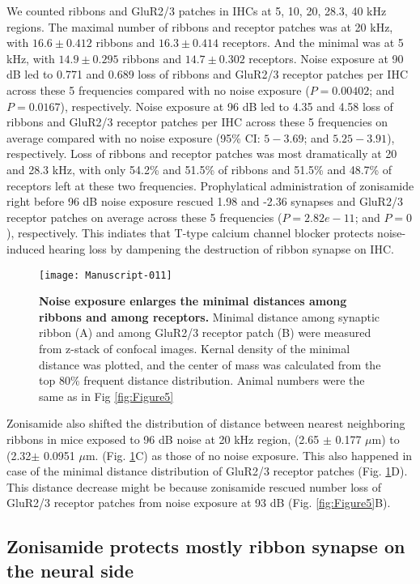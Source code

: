\documentclass[11pt]{article}
\begin{document}
We counted ribbons and GluR2/3 patches in IHCs at 5, 10, 20, 28.3, 40 kHz regions. The maximal number of ribbons and receptor patches was at 20 kHz, with 
$16.6 \pm 
0.412$ ribbons and 
$16.3 \pm 
0.414$ receptors. 
And the minimal was at 5 kHz, with 
$14.9 \pm 
0.295$ ribbons and 
$14.7 \pm 
0.302$ receptors. 
Noise exposure at 90 dB led to 0.771 and 0.689 loss of ribbons and GluR2/3 receptor patches per IHC across these 5 frequencies compared with no noise exposure 
($P=0.00402$; and 
 $P=0.0167$), respectively. Noise exposure at 96 dB led to 4.35 and 4.58 loss of ribbons and GluR2/3 receptor patches per IHC across these 5 frequencies on average compared with no noise exposure 
(95\% CI: $5 - 3.69$; and 
 $5.25 - 3.91$), respectively. Loss of ribbons and receptor patches was most dramatically at 20 and 28.3 kHz, with only 54.2\% and 51.5\% of ribbons and 
 51.5\% and 48.7\% of receptors left at these two frequencies.
 Prophylatical administration of zonisamide right before 96 dB noise exposure rescued 1.98 and -2.36 synapses and GluR2/3 receptor patches on average across these 5 frequencies 
 ($P=2.82e-11$; and 
 $P=0$), respectively. This indiates that T-type calcium channel blocker protects noise-induced hearing loss by dampening the destruction of ribbon synapse on IHC. 




\begin{figure}[ht!]
\centering
\texttt{[image: Manuscript-011]}
\caption{{\bf {Noise exposure enlarges the minimal distances among ribbons and among receptors.}}  Minimal distance among synaptic ribbon (A) and among GluR2/3 receptor patch (B) were measured from z-stack of confocal images. Kernal density of the minimal distance was plotted, and the center of mass was calculated from the top 80\% frequent distance distribution. Animal numbers were the same as in Fig \ref{fig:Figure5}}
\label{fig:Figure6}
\end{figure}


Zonisamide also shifted the distribution of distance between nearest neighboring ribbons in mice exposed to 96 dB noise at 20 kHz region,
(2.65 $\pm$ 0.177 $\mu$m) to 
(2.32$\pm$ 0.0951 $\mu$m. (Fig. \ref{fig:Figure6}C) as those of no noise exposure. This also happened in case of the minimal distance distribution of GluR2/3 receptor patches (Fig. \ref{fig:Figure6}D). This distance decrease might be because zonisamide rescued number loss of GluR2/3 receptor patches from noise exposure at 93 dB (Fig. \ref{fig:Figure5}B). 

\subsection {Zonisamide protects mostly ribbon synapse on the neural side}
\end{document}
